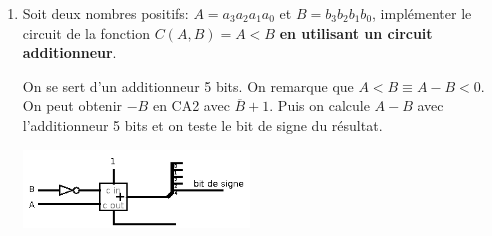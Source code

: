 \documentclass[a4paper,10pt]{exam}
\begin{document}
\begin{enumerate}
\item Soit deux nombres positifs: $A=a_3a_2a_1a_0$ et $B=b_3b_2b_1b_0$, implémenter
  le circuit de la fonction $C(A,B) = A < B$ \textbf{en utilisant un circuit
    additionneur}.
  \begin{solution}
    On se sert d'un additionneur 5 bits.
    On remarque que $A < B \equiv A - B < 0$.
    On peut obtenir $-B$ en CA2 avec $\overline{B} + 1$.
    Puis on calcule $A-B$ avec l'additionneur 5 bits et on teste le bit de signe
    du résultat.

    \includegraphics[width=6cm]{comparateur}

  \end{solution}
\end{enumerate}
\end{document}
